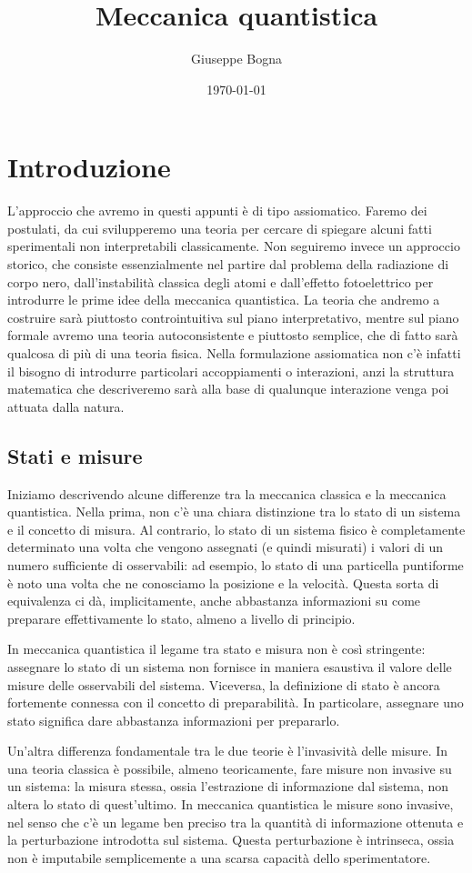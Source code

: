 \documentclass[a4paper, 11pt]{article}
\title{Meccanica quantistica}
\author{Giuseppe Bogna}
\date{\today}
\begin{document}
	\maketitle
	\tableofcontents
	\newpage
	\section{Introduzione}
	L'approccio che avremo in questi appunti è di tipo assiomatico. Faremo dei postulati, da cui svilupperemo una teoria per cercare di spiegare alcuni fatti sperimentali non interpretabili classicamente. Non seguiremo invece un approccio storico, che consiste essenzialmente nel partire dal problema della radiazione di corpo nero, dall'instabilità classica degli atomi e dall'effetto fotoelettrico per introdurre le prime idee della meccanica quantistica. La teoria che andremo a costruire sarà piuttosto controintuitiva sul piano interpretativo, mentre sul piano formale avremo una teoria autoconsistente e piuttosto semplice, che di fatto sarà qualcosa di più di una teoria fisica. Nella formulazione assiomatica non c'è infatti il bisogno di introdurre particolari accoppiamenti o interazioni, anzi la struttura matematica che descriveremo sarà alla base di qualunque interazione venga poi attuata dalla natura.
	\subsection{Stati e misure}
	Iniziamo descrivendo alcune differenze tra la meccanica classica e la meccanica quantistica. Nella prima, non c'è una chiara distinzione tra lo stato di un sistema e il concetto di misura. Al contrario, lo stato di un sistema fisico è completamente determinato una volta che vengono assegnati (e quindi misurati) i valori di un numero sufficiente di osservabili: ad esempio, lo stato di una particella puntiforme è noto una volta che ne conosciamo la posizione e la velocità. Questa sorta di equivalenza ci dà, implicitamente, anche abbastanza informazioni su come preparare effettivamente lo stato, almeno a livello di principio.
	
	In meccanica quantistica il legame tra stato e misura non è così stringente: assegnare lo stato di un sistema non fornisce in maniera esaustiva il valore delle misure delle osservabili del sistema. Viceversa, la definizione di stato è ancora fortemente connessa con il concetto di preparabilità. In particolare, assegnare uno stato significa dare abbastanza informazioni per prepararlo.
	
	Un'altra differenza fondamentale tra le due teorie è l'invasività delle misure. In una teoria classica è possibile, almeno teoricamente, fare misure non invasive su un sistema: la misura stessa, ossia l'estrazione di informazione dal sistema, non altera lo stato di quest'ultimo. In meccanica quantistica le misure sono invasive, nel senso che c'è un legame ben preciso tra la quantità di informazione ottenuta e la perturbazione introdotta sul sistema. Questa perturbazione è intrinseca, ossia non è imputabile semplicemente a una scarsa capacità dello sperimentatore.
	
\end{document}
